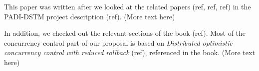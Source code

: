 
\label{sec:related}

This paper was written after we looked at the related papers (ref, ref, ref) in the 
PADI-DSTM project description (ref). (More text here) 

In addition, we checked out the relevant sections of 
the book (ref). Most of the concurrency control part of our  proposal is based on 
\textit{Distributed optimistic concurrency control with reduced rollback} (ref), referenced 
in the book. (More text here)